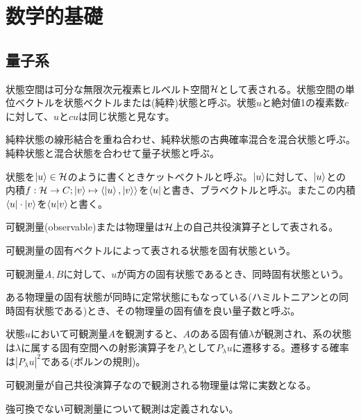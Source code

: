 \section{数学的基礎}

\subsection{量子系}
    \begin{ax}[純粋状態]
        状態空間は可分な無限次元複素ヒルベルト空間$\mathcal{H}$として表される。状態空間の単位ベクトルを状態ベクトルまたは(純粋)状態と呼ぶ。状態$u$と絶対値1の複素数$c$に対して、$u$と$cu$は同じ状態と見なす。
    \end{ax}
    純粋状態の線形結合を重ね合わせ、純粋状態の古典確率混合を混合状態と呼ぶ。純粋状態と混合状態を合わせて量子状態と呼ぶ。

    状態を$\ket{u} \in \mathcal{H}$のように書くときケットベクトルと呼ぶ。$\ket{u}$に対して、$\ket{u}$との内積$f: \mathcal{H} \to C; \ket{v} \mapsto \langle \ket{u}, \ket{v} \rangle$を$\bra{u}$と書き、ブラベクトルと呼ぶ。またこの内積$\bra{u} \cdot \ket{v}$を$\braket{u}{v}$と書く。

    \begin{ax}[可観測量]
        可観測量(observable)または物理量は$\mathcal{H}$上の自己共役演算子として表される。
    \end{ax}

    \begin{dfn}[固有状態]
        可観測量の固有ベクトルによって表される状態を固有状態という。
    \end{dfn}

    \begin{dfn}[同時固有状態]
        可観測量$A, B$に対して、$u$が両方の固有状態であるとき、同時固有状態という。
    \end{dfn}
    ある物理量の固有状態が同時に定常状態にもなっている(ハミルトニアンとの同時固有状態である)とき、その物理量の固有値を良い量子数と呼ぶ。

    \begin{ax}[射影仮説]
        状態$u$において可観測量$A$を観測すると、$A$のある固有値$\lambda$が観測され、系の状態は$\lambda$に属する固有空間への射影演算子を$P_\lambda$として$P_\lambda u$に遷移する。遷移する確率は$|P_\lambda u|^2$である(ボルンの規則)。
    \end{ax}
    可観測量が自己共役演算子なので観測される物理量は常に実数となる。

    強可換でない可観測量について観測は定義されない。

